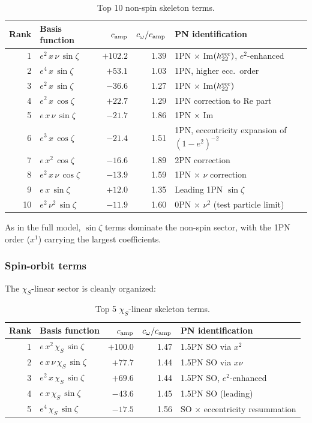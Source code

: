 \documentclass[11pt,letterpaper]{article}
\newcommand{\chiS}{\chi_S}
\begin{document}
\begin{table}[H]
\centering
\caption{Top 10 non-spin skeleton terms.}
\label{tab:skel_nonspin}
\begin{tabular}{@{}rlrrl@{}}
\toprule
Rank & Basis function & $c_{\rm amp}$ & $c_\omega/c_{\rm amp}$ & PN identification \\
\midrule
1 & $e^2\, x\, \nu\, \sin\zeta$ & $+102.2$ & 1.39 & 1PN $\times$ Im$(h_{22}^{\rm ecc})$, $e^2$-enhanced \\
2 & $e^4\, x\, \sin\zeta$ & $+53.1$ & 1.03 & 1PN, higher ecc.\ order \\
3 & $e^2\, x\, \sin\zeta$ & $-36.6$ & 1.27 & 1PN $\times$ Im$(h_{22}^{\rm ecc})$ \\
4 & $e^2\, x\, \cos\zeta$ & $+22.7$ & 1.29 & 1PN correction to Re part \\
5 & $e\, x\, \nu\, \sin\zeta$ & $-21.7$ & 1.86 & 1PN $\times$ Im \\
6 & $e^3\, x\, \cos\zeta$ & $-21.4$ & 1.51 & 1PN, eccentricity expansion of $(1-e^2)^{-2}$ \\
7 & $e\, x^2\, \cos\zeta$ & $-16.6$ & 1.89 & 2PN correction \\
8 & $e^2\, x\, \nu\, \cos\zeta$ & $-13.9$ & 1.59 & 1PN $\times$ $\nu$ correction \\
9 & $e\, x\, \sin\zeta$ & $+12.0$ & 1.35 & Leading 1PN $\sin\zeta$ \\
10 & $e^2\, \nu^2\, \sin\zeta$ & $-11.9$ & 1.60 & 0PN $\times$ $\nu^2$ (test particle limit) \\
\bottomrule
\end{tabular}
\end{table}

\noindent As in the full model, $\sin\zeta$ terms dominate the non-spin sector, with the 1PN order ($x^1$) carrying the largest coefficients.

\subsubsection{Spin-orbit terms}

The $\chiS$-linear sector is cleanly organized:

\begin{table}[H]
\centering
\caption{Top 5 $\chiS$-linear skeleton terms.}
\label{tab:skel_chiS}
\begin{tabular}{@{}rlrrl@{}}
\toprule
Rank & Basis function & $c_{\rm amp}$ & $c_\omega/c_{\rm amp}$ & PN identification \\
\midrule
1 & $e\, x^2\, \chiS\, \sin\zeta$ & $+100.0$ & 1.47 & 1.5PN SO via $x^2$ \\
2 & $e\, x\, \nu\, \chiS\, \sin\zeta$ & $+77.7$ & 1.44 & 1.5PN SO via $x\nu$ \\
3 & $e^2\, x\, \chiS\, \sin\zeta$ & $+69.6$ & 1.44 & 1.5PN SO, $e^2$-enhanced \\
4 & $e\, x\, \chiS\, \sin\zeta$ & $-43.6$ & 1.45 & 1.5PN SO (leading) \\
5 & $e^4\, \chiS\, \sin\zeta$ & $-17.5$ & 1.56 & SO $\times$ eccentricity resummation \\
\bottomrule
\end{tabular}
\end{table}
\end{document}
